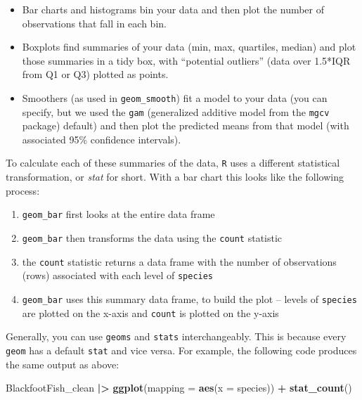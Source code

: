 \documentclass[
  10pt,
  letterpaper,
  twoside,
  openright]{book}
\newenvironment{Shaded}{\begin{snugshade}}{\end{snugshade}}
\newcommand{\AttributeTok}[1]{\textcolor[rgb]{0.13,0.29,0.53}{#1}}
\newcommand{\FunctionTok}[1]{\textcolor[rgb]{0.13,0.29,0.53}{\textbf{#1}}}
\newcommand{\NormalTok}[1]{#1}
\newcommand{\SpecialCharTok}[1]{\textcolor[rgb]{0.81,0.36,0.00}{\textbf{#1}}}
\providecommand{\tightlist}{%
  \setlength{\itemsep}{0pt}\setlength{\parskip}{0pt}}
\begin{document}
\begin{itemize}
\item
  Bar charts and histograms bin your data and then plot the number of
  observations that fall in each bin.
\item
  Boxplots find summaries of your data (min, max, quartiles, median) and
  plot those summaries in a tidy box, with ``potential outliers'' (data
  over 1.5*IQR from Q1 or Q3) plotted as points.
\item
  Smoothers (as used in \texttt{geom\_smooth}) fit a model to your data
  (you can specify, but we used the \texttt{gam} (generalized additive
  model from the \texttt{mgcv} package) default) and then plot the
  predicted means from that model (with associated 95\% confidence
  intervals).
\end{itemize}

To calculate each of these summaries of the data, \texttt{R} uses a
different statistical transformation, or \emph{stat} for short. With a
bar chart this looks like the following process:

\begin{enumerate}
\def\labelenumi{\arabic{enumi}.}
\tightlist
\item
  \texttt{geom\_bar} first looks at the entire data frame\\
\item
  \texttt{geom\_bar} then transforms the data using the \texttt{count}
  statistic\\
\item
  the \texttt{count} statistic returns a data frame with the number of
  observations (rows) associated with each level of \texttt{species}\\
\item
  \texttt{geom\_bar} uses this summary data frame, to build the plot --
  levels of \texttt{species} are plotted on the x-axis and
  \texttt{count} is plotted on the y-axis
\end{enumerate}

Generally, you can use \texttt{geoms} and \texttt{stats}
interchangeably. This is because every \texttt{geom} has a default
\texttt{stat} and vice versa. For example, the following code produces
the same output as above:

\begin{Shaded}
\begin{Highlighting}[]
\NormalTok{BlackfootFish\_clean }\SpecialCharTok{|\textgreater{}}
  \FunctionTok{ggplot}\NormalTok{(}\AttributeTok{mapping =} \FunctionTok{aes}\NormalTok{(}\AttributeTok{x =}\NormalTok{ species)) }\SpecialCharTok{+} 
  \FunctionTok{stat\_count}\NormalTok{()}
\end{Highlighting}
\end{Shaded}
\end{document}
